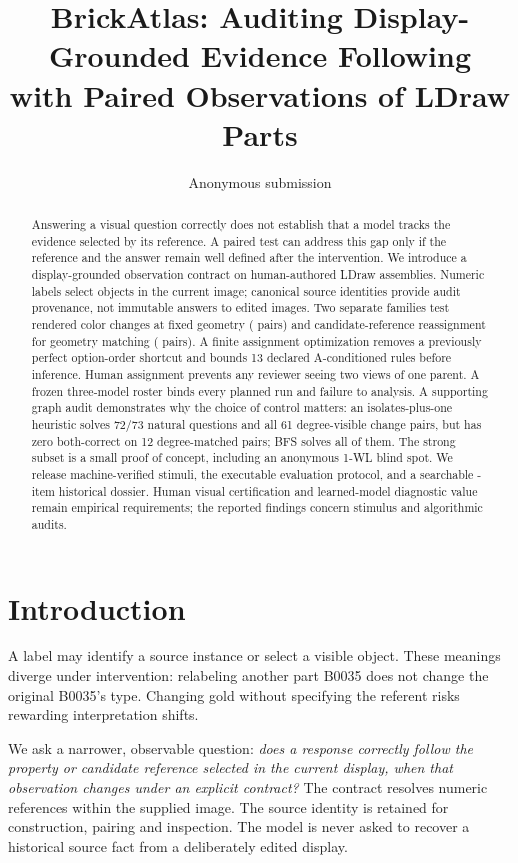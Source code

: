 \documentclass[10pt,twocolumn,letterpaper]{article}
\title{BrickAtlas: Auditing Display-Grounded Evidence Following\\
with Paired Observations of LDraw Parts}
\author{Anonymous submission}
\begin{document}
\maketitle

\begin{abstract}
Answering a visual question correctly does not establish that a model
tracks the evidence selected by its reference. A paired test can address
this gap only if the reference and the answer remain well defined after
the intervention. We introduce a display-grounded observation contract
on \EvSources{} human-authored LDraw assemblies. Numeric labels select
objects in the current image; canonical source identities provide audit
provenance, not immutable answers to edited images. Two separate families
test rendered color changes at fixed geometry (\EvColor{} pairs) and
candidate-reference reassignment for geometry matching (\EvType{} pairs).
A finite assignment optimization removes a previously perfect option-order
shortcut and bounds 13 declared A-conditioned rules before inference.
Human assignment prevents any reviewer seeing two views of one parent.
A frozen three-model roster binds every planned run and failure to analysis.
A supporting graph audit demonstrates why the choice of control matters:
an isolates-plus-one heuristic solves 72/73 natural questions and all
61 degree-visible change pairs, but has zero both-correct on 12
degree-matched pairs; BFS solves all of them. The strong subset is a
small proof of concept, including an anonymous 1-WL blind spot.
We release machine-verified stimuli, the executable evaluation protocol,
and a searchable \EvTasks{}-item historical dossier. Human visual
certification and learned-model diagnostic value remain empirical
requirements; the reported findings concern stimulus and algorithmic
audits.
\end{abstract}

\section{Introduction}
A label may identify a source instance or select a visible object.
These meanings diverge under intervention: relabeling another part
B0035 does not change the original B0035's type. Changing gold without
specifying the referent risks rewarding interpretation shifts.

We ask a narrower, observable question: \emph{does a response correctly
follow the property or candidate reference selected in the current
display, when that observation changes under an explicit contract?}
The contract resolves numeric references within the supplied image.
The source identity is retained for construction, pairing and inspection.
The model is never asked to recover a historical source fact from a
deliberately edited display.
\end{document}

